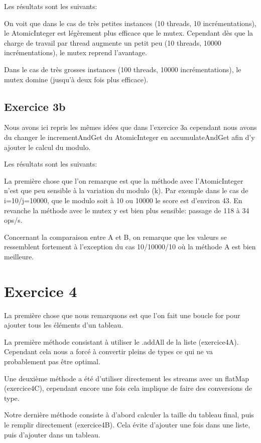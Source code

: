 \documentclass[12pt]{extreport}
\begin{document}
			Les résultats sont les suivants:
			
			
			On voit que dans le cas de très petites instances (10 threads, 10 incrémentations), le AtomicInteger est légèrement plus efficace que le mutex.
			Cependant dès que la charge de travail par thread augmente un petit peu (10 threads, 10000 incrémentations), le mutex reprend l'avantage.
			
			Dans le cas de très grosses instances (100 threads, 10000 incrémentations), le mutex domine (jusqu'à deux fois plus efficace).
		
		\subsection{Exercice 3b}
			Nous avons ici repris les mêmes idées que dans l'exercice 3a cependant nous avons du changer le incrementAndGet du AtomicInteger en accumulateAndGet afin d'y ajouter le calcul du modulo.
			
			Les résultats sont les suivants:
			
			
			La première chose que l'on remarque est que la méthode avec l'AtomicInteger n'est que peu sensible à la variation du modulo (k).
			Par exemple dans le cas de i=10/j=10000, que le modulo soit à 10 ou 10000 le score est d'environ 43.
			En revanche la méthode avec le mutex y est bien plus sensible: passage de 118 à 34 ops/s.
			
			Concernant la comparaison entre A et B, on remarque que les valeurs se ressemblent fortement à l'exception du cas 10/10000/10 où la méthode A est bien meilleure.

	\section{Exercice 4}
		La première chose que nous remarquons est que l'on fait une boucle for pour ajouter tous les éléments d'un tableau.
		
		La première méthode consistant à utiliser le .addAll de la liste (exercice4A).
		Cependant cela nous a forcé à convertir pleins de types ce qui ne va probablement pas être optimal.
		
		Une deuxième méthode a été d'utiliser directement les streams avec un flatMap (exercice4C), cependant encore une fois cela implique de faire des conversions de type.
		
		Notre dernière méthode consiste à d'abord calculer la taille du tableau final, puis le remplir directement (exercice4B).
		Cela évite d'ajouter une fois dans une liste, puis d'ajouter dans un tableau.
		
\end{document}
